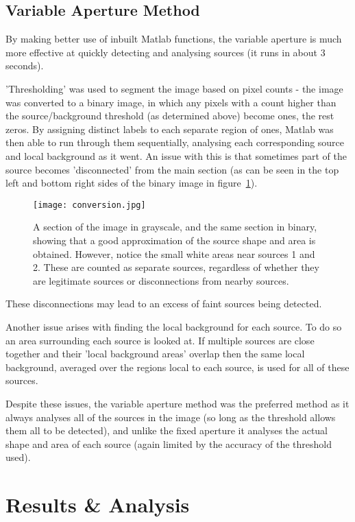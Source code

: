 \documentclass[a4paper,11pt,twoside]{article}
\begin{document}
\subsection{Variable Aperture Method}

By making better use of inbuilt Matlab functions, the variable aperture is 
much more effective at quickly detecting and analysing sources (it runs in 
about 3 seconds). 

'Thresholding' was used to segment the image based on pixel counts - the 
image was converted to a binary image, in which any pixels with a count 
higher than the source/background threshold (as determined above) become 
ones, the rest zeros. By assigning distinct labels to each separate 
region of ones, Matlab was then able to run through them sequentially, 
analysing each corresponding source and local background as it went.
An issue with this is that sometimes part of the source becomes 'disconnected' 
from the main section (as can be seen in the top left and bottom 
right sides of the binary image in figure~\ref{fig:conversion}).

\begin{figure}[htb]
  \centering
  \texttt{[image: conversion.jpg]}
  \caption{A section of the image in grayscale, and the same section 
in binary, showing that a good approximation of the source shape and 
area is obtained. However, notice the small white areas near sources 
1 and 2. These are counted as separate sources, regardless of whether 
they are legitimate sources or disconnections from nearby sources.}
  \label{fig:conversion}
\end{figure}

These disconnections may lead to an excess of faint sources being detected.

Another issue arises with finding the local background for each source. 
To do so an area surrounding each source is looked at. If multiple sources 
are close together and their 'local background areas' overlap then the 
same local background, averaged over the regions local to each source, 
is used for all of these sources.

Despite these issues, the variable aperture method was the preferred 
method as it always analyses all of the sources in the image (so 
long as the threshold allows them all to be detected), and unlike 
the fixed aperture it analyses the actual shape and area of each 
source (again limited by the accuracy of the threshold used).

\section{Results \& Analysis}
\end{document}
